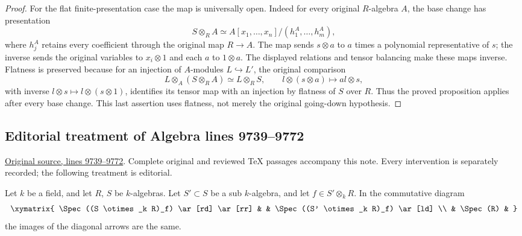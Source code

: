 \begin{proof}
For the flat finite-presentation case the map is
universally open. Indeed for every original
$R$-algebra $A$, the base change has presentation
$$
S\otimes_RA\simeq
A[x_1,\ldots,x_n]/(h_1^A,\ldots,h_m^A),
$$
where $h_j^A$ retains every coefficient through
the original map $R\to A$. The map sends
$s\otimes a$ to $a$ times a polynomial representative
of $s$; the inverse sends the original variables
to $x_i\otimes1$ and each $a$ to $1\otimes a$.
The displayed relations and tensor balancing make
these maps inverse. Flatness is preserved because
for an injection of $A$-modules $L\hookrightarrow L'$,
the original comparison
$$
L\otimes_A(S\otimes_RA)\simeq L\otimes_RS,
\qquad l\otimes(s\otimes a)\longmapsto al\otimes s,
$$
with inverse $l\otimes s\mapsto l\otimes(s\otimes1)$,
identifies its tensor map with an injection by
flatness of $S$ over $R$. Thus the proved proposition
applies after every base change. This last assertion
uses flatness, not merely the original going-down
hypothesis.
\end{proof}


\subsection{Editorial treatment of Algebra lines 9739--9772}

\hypertarget{algebra-context-112}{}

\noindent\href{https://github.com/stacks/stacks-project/blob/a04446e57ec1fbc252a871afcec7752fb2807b14/algebra.tex\#L9739}{Original source, lines 9739--9772}. Complete original and reviewed TeX passages accompany this note. Every intervention is separately recorded; the following treatment is editorial.


\begin{lemma}
\label{editorial-source-lemma-same-image}
Let $k$ be a field, and let $R$, $S$ be $k$-algebras.
Let $S' \subset S$ be a sub $k$-algebra, and let $f \in S' \otimes_k R$.
In the commutative diagram
$$
\xymatrix{
\Spec((S \otimes_k R)_f) \ar[rd] \ar[rr] & &
\Spec((S' \otimes_k R)_f) \ar[ld] \\
& \Spec(R) &
}
$$
the images of the diagonal arrows are the same.
\end{lemma}

